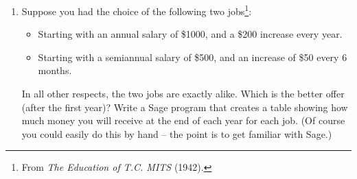\begin{enumerate}

\item Suppose you had the choice of the following two jobs\footnote{From {\em The Education of T.C. MITS} (1942).}:
\begin{itemize}
\item[Job 1] Starting with an annual salary of \$1000,
and a \$200 increase every year.
\item[Job 2] Starting with a semiannual salary of \$500,
and an increase of \$50 every 6 months.
\end{itemize}
In all other respects, the two jobs are exactly alike.
Which is the better offer (after the first year)?  
Write a Sage program that creates a table showing how
much money you will receive at the end of each year for
each job. (Of course you could easily do this by hand -- the
point is to get familiar with Sage.)






\end{enumerate}
